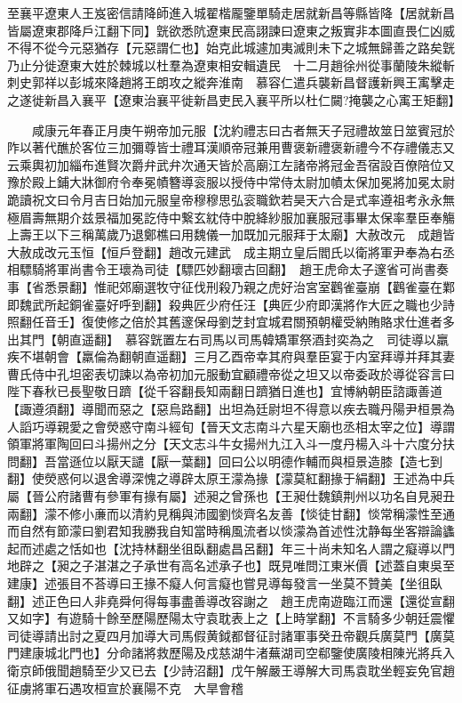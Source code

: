 至襄平遼東人王岌密信請降師進入城翟楷龎鑒單騎走居就新昌等縣皆降【居就新昌皆屬遼東郡降戶江翻下同】皝欲悉阬遼東民高詡諫曰遼東之叛實非本圖直畏仁凶威不得不從今元惡猶存【元惡謂仁也】始克此城遽加夷滅則未下之城無歸善之路矣皝乃止分徙遼東大姓於棘城以杜羣為遼東相安輯遺民　十二月趙徐州從事蘭陵朱縱斬刺史郭祥以彭城來降趙將王朗攻之縱奔淮南　慕容仁遣兵襲新昌督護新興王㝢擊走之遂徙新昌入襄平【遼東治襄平徙新昌吏民入襄平所以杜仁闚?掩襲之心㝢王矩翻】

　　咸康元年春正月庚午朔帝加元服【沈約禮志曰古者無天子冠禮故筮日筮賓冠於阼以著代醮於客位三加彌尊皆士禮耳漢順帝冠兼用曹褒新禮褒新禮今不存禮儀志又云乘輿初加緇布進賢次爵弁武弁次通天皆於高廟江左諸帝將冠金吾宿設百僚陪位又豫於殿上鋪大牀御府令奉冕幘簪導衮服以授侍中常侍太尉加幘太保加冕將加冕太尉跪讀祝文曰令月吉日始加元服皇帝穆穆思弘衮職欽若昊天六合是式率遵祖考永永無極眉壽無期介兹景福加冕訖侍中繋玄紞侍中脫絳紗服加襄服冠事畢太保率羣臣奉觴上壽王以下三稱萬歲乃退鄭樵曰用魏儀一加既加元服拜于太廟】大赦改元　成趙皆大赦成改元玉恒【恒戶登翻】趙改元建武　成主期立皇后閻氏以衛將軍尹奉為右丞相驃騎將軍尚書令王瓌為司徒【驃匹妙翻瓌古回翻】　趙王虎命太子邃省可尚書奏事【省悉景翻】惟祀郊廟選牧守征伐刑殺乃親之虎好治宮室鸛雀臺崩【鸛雀臺在鄴即魏武所起銅雀臺好呼到翻】殺典匠少府任汪【典匠少府即漢將作大匠之職也少詩照翻任音壬】復使修之倍於其舊邃保母劉芝封宜城君關預朝權受納賄賂求仕進者多出其門【朝直遥翻】　慕容皝置左右司馬以司馬韓矯軍祭酒封奕為之　司徒導以羸疾不堪朝會【羸倫為翻朝直遥翻】三月乙酉帝幸其府與羣臣宴于内室拜導并拜其妻曹氏侍中孔坦密表切諫以為帝初加元服動宜顧禮帝從之坦又以帝委政於導從容言曰陛下春秋已長聖敬日躋【從千容翻長知兩翻日躋猶日進也】宜博納朝臣諮諏善道【諏遵須翻】導聞而惡之【惡烏路翻】出坦為廷尉坦不得意以疾去職丹陽尹桓景為人謟巧導親愛之會熒惑守南斗經旬【晉天文志南斗六星天廟也丞相太宰之位】導謂領軍將軍陶回曰斗揚州之分【天文志斗牛女揚州九江入斗一度丹楊入斗十六度分扶問翻】吾當遜位以厭天譴【厭一葉翻】回曰公以明德作輔而與桓景造膝【造七到翻】使熒惑何以退舍導深愧之導辟太原王濛為掾【濛莫紅翻掾于絹翻】王述為中兵屬【晉公府諸曹有參軍有掾有屬】述昶之曾孫也【王昶仕魏鎮荆州以功名自見昶丑兩翻】濛不修小亷而以清約見稱與沛國劉惔齊名友善【惔徒甘翻】惔常稱濛性至通而自然有節濛曰劉君知我勝我自知當時稱風流者以惔濛為首述性沈静每坐客辯論蠭起而述處之恬如也【沈持林翻坐徂臥翻處昌呂翻】年三十尚未知名人謂之癡導以門地辟之【昶之子湛湛之子承世有高名述承子也】既見唯問江東米價【述蓋自東吳至建康】述張目不荅導曰王掾不癡人何言癡也嘗見導每發言一坐莫不贊美【坐徂臥翻】述正色曰人非堯舜何得每事盡善導改容謝之　趙王虎南遊臨江而還【還從宣翻又如字】有遊騎十餘至歷陽歷陽太守袁耽表上之【上時掌翻】不言騎多少朝廷震懼司徒導請出討之夏四月加導大司馬假黄鉞都督征討諸軍事癸丑帝觀兵廣莫門【廣莫門建康城北門也】分命諸將救歷陽及戍慈湖牛渚蕪湖司空郗鑒使廣陵相陳光將兵入衛京師俄聞趙騎至少又已去【少詩沼翻】戊午解嚴王導解大司馬袁耽坐輕妄免官趙征虜將軍石遇攻桓宣於襄陽不克　大旱會稽

